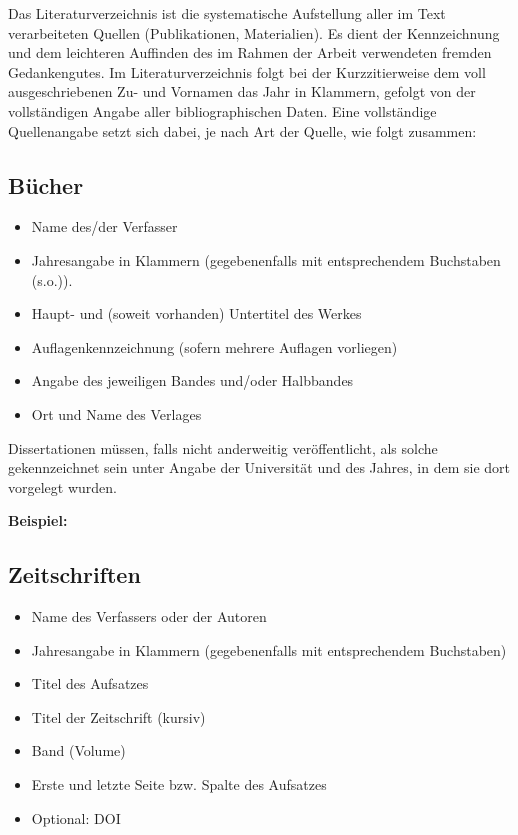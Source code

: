 \documentclass[a4paper,12pt]{scrartcl} %
\begin{document}
Das Literaturverzeichnis ist die systematische Aufstellung aller im Text verarbeiteten Quellen (Publikationen, Materialien). Es dient der Kennzeichnung und dem leichteren Auffinden des im Rahmen der Arbeit verwendeten fremden Gedankengutes. Im Literaturverzeichnis folgt bei der Kurzzitierweise dem voll ausgeschriebenen Zu- und Vornamen das Jahr in Klammern, gefolgt von der vollständigen Angabe aller bibliographischen Daten. Eine vollständige Quellenangabe setzt sich dabei, je nach Art der Quelle, wie folgt zusammen:

\subsection{Bücher}

\begin{itemize}
\item Name des/der Verfasser
\item Jahresangabe in Klammern (gegebenenfalls mit entsprechendem Buchstaben (s.o.)).
\item Haupt- und (soweit vorhanden) Untertitel des Werkes
\item Auflagenkennzeichnung (sofern mehrere Auflagen vorliegen)
\item Angabe des jeweiligen Bandes und/oder Halbbandes
\item Ort und Name des Verlages
\end{itemize}

Dissertationen müssen, falls nicht anderweitig veröffentlicht, als solche gekennzeichnet sein unter Angabe der
Universität und des Jahres, in dem sie dort vorgelegt wurden.

\textbf{Beispiel:}


\subsection{Zeitschriften}

\begin{itemize}
\item Name des Verfassers oder der Autoren
\item Jahresangabe in Klammern (gegebenenfalls mit entsprechendem Buchstaben)
\item Titel des Aufsatzes
\item Titel der Zeitschrift (kursiv)
\item Band (Volume)
\item Erste und letzte Seite bzw. Spalte des Aufsatzes
\item Optional: DOI
\end{itemize}
\end{document}
